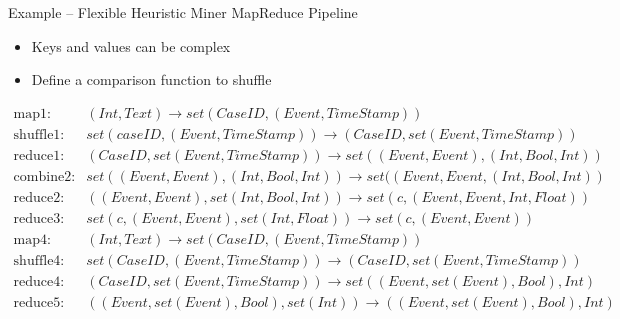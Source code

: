 \documentclass[ignorenonframetext,xcolor=x11names]{beamer}
\begin{document}
\begin{frame}{Example -- Flexible Heuristic Miner MapReduce Pipeline}

\begin{itemize}
\item Keys and values can be complex
\item Define a comparison function to shuffle
\end{itemize}
\footnotesize
\begin{align*}
\text{map1:} &(Int, Text) \rightarrow set(CaseID, (Event, TimeStamp)) \\
\text{shuffle1:} &set(caseID, (Event, TimeStamp)) \rightarrow (CaseID, set(Event, TimeStamp)) \\
\text{reduce1:}  &(CaseID, set(Event, TimeStamp)) \rightarrow set((Event, Event), (Int, Bool, Int)) \\
\text{combine2:} &set((Event, Event), (Int, Bool, Int)) \rightarrow set((Event, Event, (Int, Bool, Int)) \\
\text{reduce2:}   &((Event, Event), set(Int, Bool, Int)) \rightarrow set(c, (Event, Event, Int, Float)) \\
\text{reduce3:}  & set(c, (Event, Event), set(Int, Float)) \rightarrow set(c, (Event, Event)) \\
\text{map4:}     & (Int, Text) \rightarrow set(CaseID, (Event, TimeStamp)) \\
\text{shuffle4:} & set(CaseID, (Event, TimeStamp)) \rightarrow (CaseID, set(Event, TimeStamp)) \\
\text{reduce4:}  & (CaseID, set(Event, TimeStamp)) \rightarrow set((Event, set(Event), Bool), Int) \\
\text{reduce5:}  & ((Event, set(Event), Bool), set(Int)) \rightarrow ((Event, set(Event), Bool), Int) 
\end{align*}
\end{frame}
\end{document}
